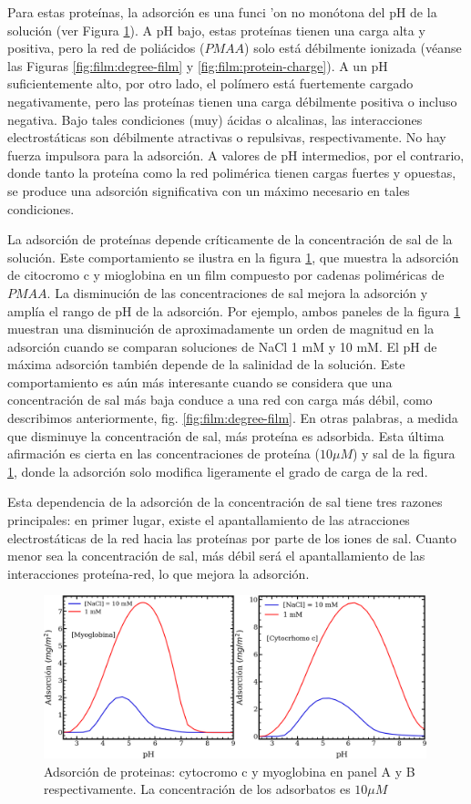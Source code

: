 Para estas prote\'inas, la adsorci\'on es una funci
'on no mon\'otona del pH de la soluci\'on (ver Figura \ref{fig:film:ad-pro}). A pH bajo, estas prote\'inas tienen una carga alta y positiva, pero la red de poli\'acidos ($PMAA$) solo est\'a d\'ebilmente ionizada (v\'eanse las Figuras \ref{fig:film:degree-film} y \ref{fig:film:protein-charge}). A un pH suficientemente alto, por otro lado, el pol\'imero est\'a fuertemente cargado negativamente, pero las prote\'inas tienen una carga d\'ebilmente positiva o incluso negativa. Bajo tales condiciones (muy) \'acidas o alcalinas, las interacciones electrost\'aticas son d\'ebilmente atractivas o repulsivas, respectivamente. No hay fuerza impulsora para la adsorci\'on. A valores de pH intermedios, por el contrario, donde tanto la prote\'ina como la red polim\'erica tienen cargas fuertes y opuestas, se produce una adsorci\'on significativa con un m\'aximo necesario en tales condiciones.

La adsorci\'on de prote\'inas depende cr\'iticamente de la concentraci\'on de sal de la soluci\'on. Este comportamiento se ilustra en la figura \ref{fig:film:ad-pro}, que muestra la adsorci\'on de citocromo c y mioglobina en un film compuesto por cadenas polim\'ericas de $PMAA$. La disminuci\'on de las concentraciones de sal mejora la adsorci\'on y ampl\'ia el rango de pH de la adsorci\'on.
Por ejemplo, ambos paneles de la figura \ref{fig:film:ad-pro} muestran una disminuci\'on de aproximadamente un orden de magnitud en la adsorci\'on cuando se comparan soluciones de NaCl 1 mM y 10 mM.
El pH de m\'axima adsorci\'on tambi\'en depende de la salinidad de la soluci\'on. Este comportamiento es a\'un m\'as interesante cuando se considera que una concentraci\'on de sal m\'as baja conduce a una red con carga m\'as d\'ebil, como describimos anteriormente, fig. \ref{fig:film:degree-film}.
En otras palabras, a medida que disminuye la concentraci\'on de sal, m\'as prote\'ina es adsorbida. Esta \'ultima afirmaci\'on es cierta en las concentraciones de prote\'ina ($10 \mu M$) y sal de la figura \ref{fig:film:ad-pro}, donde la adsorci\'on solo modifica ligeramente el grado de carga de la red.

Esta dependencia de la adsorci\'on de la concentraci\'on de sal tiene tres razones principales: en primer lugar, existe el apantallamiento de las atracciones electrost\'aticas de la red hacia las prote\'inas por parte de los iones de sal.
Cuanto menor sea la concentraci\'on de sal, m\'as d\'ebil ser\'a el apantallamiento de las interacciones prote\'ina-red, lo que mejora la adsorci\'on.




\begin{figure}
    \centering
    \includegraphics[width=0.99\textwidth]{Figures/graph-film/ad-proteins.png}
    \caption{Adsorci\'on de proteinas: cytocromo c y myoglobina en panel A y B respectivamente. La concentraci\'on de los adsorbatos es $10 \mu M$}
    \label{fig:film:ad-pro}
\end{figure}
